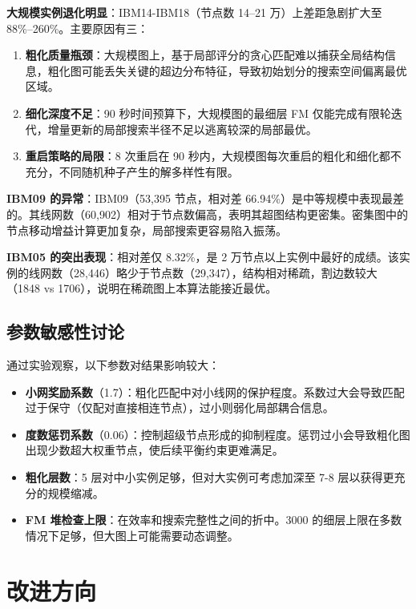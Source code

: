 \documentclass[journal, twocolumn]{IEEEtran}
\begin{document}
\textbf{大规模实例退化明显}：IBM14-IBM18（节点数 14--21 万）上差距急剧扩大至 88\%--260\%。主要原因有三：

\begin{enumerate}
    \item \textbf{粗化质量瓶颈}：大规模图上，基于局部评分的贪心匹配难以捕获全局结构信息，粗化图可能丢失关键的超边分布特征，导致初始划分的搜索空间偏离最优区域。
    \item \textbf{细化深度不足}：90 秒时间预算下，大规模图的最细层 FM 仅能完成有限轮迭代，增量更新的局部搜索半径不足以逃离较深的局部最优。
    \item \textbf{重启策略的局限}：8 次重启在 90 秒内，大规模图每次重启的粗化和细化都不充分，不同随机种子产生的解多样性有限。
\end{enumerate}

\textbf{IBM09 的异常}：IBM09（53,395 节点，相对差 66.94\%）是中等规模中表现最差的。其线网数（60,902）相对于节点数偏高，表明其超图结构更密集。密集图中的节点移动增益计算更加复杂，局部搜索更容易陷入振荡。

\textbf{IBM05 的突出表现}：相对差仅 8.32\%，是 2 万节点以上实例中最好的成绩。该实例的线网数（28,446）略少于节点数（29,347），结构相对稀疏，割边数较大（1848 vs 1706），说明在稀疏图上本算法能接近最优。

\subsection{参数敏感性讨论}

通过实验观察，以下参数对结果影响较大：

\begin{itemize}
    \item \textbf{小网奖励系数}（1.7）：粗化匹配中对小线网的保护程度。系数过大会导致匹配过于保守（仅配对直接相连节点），过小则弱化局部耦合信息。
    \item \textbf{度数惩罚系数}（0.06）：控制超级节点形成的抑制程度。惩罚过小会导致粗化图出现少数超大权重节点，使后续平衡约束更难满足。
    \item \textbf{粗化层数}：5 层对中小实例足够，但对大实例可考虑加深至 7-8 层以获得更充分的规模缩减。
    \item \textbf{FM 堆检查上限}：在效率和搜索完整性之间的折中。3000 的细层上限在多数情况下足够，但大图上可能需要动态调整。
\end{itemize}

\section{改进方向}
\end{document}
